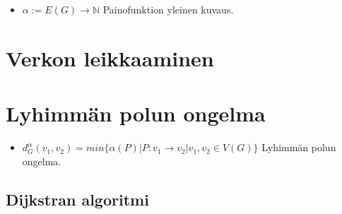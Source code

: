 \begin{itemize}
  \item \(\alpha := E(G) \rightarrow \mathbb{N}\) Painofunktion yleinen kuvaus.
\end{itemize}

\section{Verkon leikkaaminen}

\section{Lyhimmän polun ongelma}

\begin{itemize}
  \item \(d_G^\alpha(v_1, v_2) = min\{\alpha(P) | P:v_1 \rightarrow v_2 | v_1, v_2 \in V(G)\}\) Lyhimmän polun ongelma.
\end{itemize}

  \subsection{Dijkstran algoritmi}
